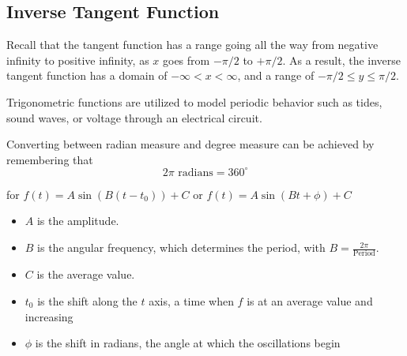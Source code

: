 
\subsection*{Inverse Tangent Function}

Recall that the tangent function has a range going all the way from negative infinity to
positive infinity, as $x$ goes from $-\pi/2$ to $+\pi/2$.  As a result, the inverse
tangent function has a domain of $-\infty < x < \infty$, and a range of $-\pi/2 \leq y
\leq \pi/2$.

\begin{center}
\end{center}
% 
% 


\clearpage


\begin{summary}
\item Trigonometric functions are utilized to model periodic behavior such as tides,
    sound waves, or voltage through an electrical circuit.
\item Converting between radian measure and degree measure can be achieved by remembering
    that
    \[ 2\pi \text{ radians} = 360^\circ \]
\item for $f(t) = A \sin( B ( t - t_0) ) + C$ or $f(t) = A \sin( B t + \phi) + C$
\begin{itemize}
\item $A$ is the amplitude.  
\item $B$ is the angular frequency, which determines the period, with $B = \frac{2 \pi}{\mbox{Period}}$.  
\item $C$ is the average value.  
\item $t_0$ is the shift along the $t$ axis, a time when $f$ is at an average value and increasing
\item $\phi$ is the shift in radians, the angle at which the oscillations begin
\end{itemize}
\end{summary}







\clearpage
